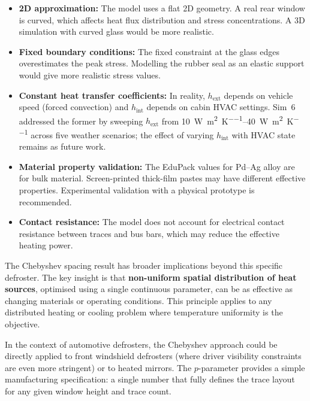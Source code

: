 \begin{itemize}
    \item \textbf{2D approximation:} The model uses a flat 2D geometry. A real rear window is curved, which affects heat flux distribution and stress concentrations. A 3D simulation with curved glass would be more realistic.

    \item \textbf{Fixed boundary conditions:} The fixed constraint at the glass edges overestimates the peak stress. Modelling the rubber seal as an elastic support would give more realistic stress values.

    \item \textbf{Constant heat transfer coefficients:} In reality, $h_\text{ext}$ depends on vehicle speed (forced convection) and $h_\text{int}$ depends on cabin HVAC settings. Sim~6 addressed the former by sweeping $h_\text{ext}$ from \SIrange{10}{40}{\watt\per\metre\squared\per\kelvin} across five weather scenarios; the effect of varying $h_\text{int}$ with HVAC state remains as future work.

    \item \textbf{Material property validation:} The EduPack values for Pd--Ag alloy are for bulk material. Screen-printed thick-film pastes may have different effective properties. Experimental validation with a physical prototype is recommended.

    \item \textbf{Contact resistance:} The model does not account for electrical contact resistance between traces and bus bars, which may reduce the effective heating power.
\end{itemize}

The Chebyshev spacing result has broader implications beyond this specific defroster. The key insight is that \textbf{non-uniform spatial distribution of heat sources}, optimised using a single continuous parameter, can be as effective as changing materials or operating conditions. This principle applies to any distributed heating or cooling problem where temperature uniformity is the objective.

In the context of automotive defrosters, the Chebyshev approach could be directly applied to front windshield defrosters (where driver visibility constraints are even more stringent) or to heated mirrors. The $p$-parameter provides a simple manufacturing specification: a single number that fully defines the trace layout for any given window height and trace count.

